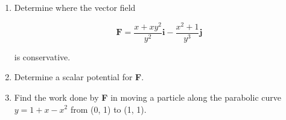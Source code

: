 \documentclass[11pt,letterpaper,boxed]{pset}
\begin{document}
    \begin{problem} [6.3.33]
    
    	\begin{enumerate}
    	    \item Determine where the vector field
    
        	    \[\textbf{F} = \frac{x+xy^2}{y^2} \textbf{i} - \frac{x^2+1}{y^3}\textbf{j}\]
        
        	    is conservative.
        	\item Determine a scalar potential for \textbf{F}.
        	\item Find the work done by \textbf{F} in moving a particle along the parabolic curve  $y = 1 + x - x^2$ from (0, 1) to (1, 1). 
    	\end{enumerate}
    	
    \end{problem}
    \newpage
\end{document}
